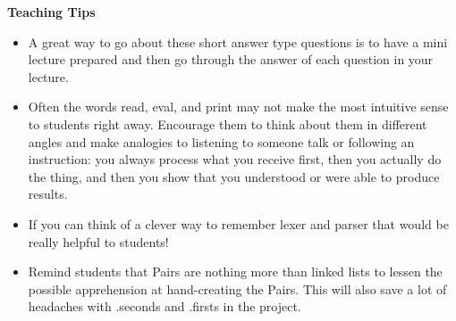 \begin{blocksection}
\begin{guide}
\textbf{Teaching Tips}
\begin{itemize}
	\item A great way to go about these short answer type questions is to have a mini lecture prepared and then go through the answer of each question in your lecture.
	\item Often the words read, eval, and print may not make the most intuitive sense to students right away. Encourage them to think about them in different angles and make analogies to listening to someone talk or following an instruction: you always process what you receive first, then you actually do the thing, and then you show that you understood or were able to produce results.
	\item If you can think of a clever way to remember lexer and parser that would be really helpful to students!
	\item Remind students that Pairs are nothing more than linked lists to lessen the possible apprehension at hand-creating the Pairs. This will also save a lot of headaches with .seconds and .firsts in the project.
\end{itemize}
\end{guide}
\end{blocksection}